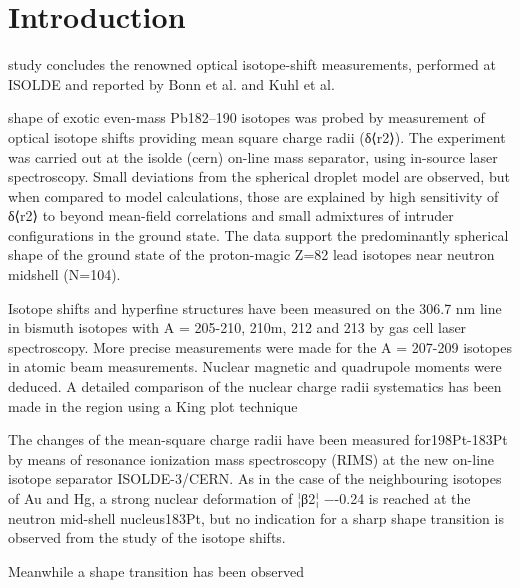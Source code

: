 \section{Introduction} 



study concludes the renowned optical isotope-shift measurements, performed at ISOLDE and reported by Bonn et al. and Kuhl et al.

shape of exotic even-mass Pb182–190 isotopes was probed by measurement of optical isotope shifts providing mean square charge radii (δ⟨r2⟩). The experiment was carried out at the isolde (cern) on-line mass separator, using in-source laser spectroscopy. Small deviations from the spherical droplet model are observed, but when compared to model calculations, those are explained by high sensitivity of δ⟨r2⟩ to beyond mean-field correlations and small admixtures of intruder configurations in the ground state. The data support the predominantly spherical shape of the ground state of the proton-magic Z=82 lead isotopes near neutron midshell (N=104).


Isotope shifts and hyperfine structures have been measured on the 306.7 nm line in bismuth isotopes with A = 205-210, 210m, 212 and 213 by gas cell laser spectroscopy. More precise measurements were made for the A = 207-209 isotopes in atomic beam measurements. Nuclear magnetic and quadrupole moments were deduced. A detailed comparison of the nuclear charge radii systematics has been made in the region using a King plot technique

The changes of the mean-square charge radii have been measured for198Pt-183Pt by means of resonance ionization mass spectroscopy (RIMS) at the new on-line isotope separator ISOLDE-3/CERN. As in the case of the neighbouring isotopes of Au and Hg, a strong nuclear deformation of ¦β2¦ −-0.24 is reached at the neutron mid-shell nucleus183Pt, but no indication for a sharp shape transition is observed from the study of the isotope shifts.




Meanwhile a shape transition has been observed

